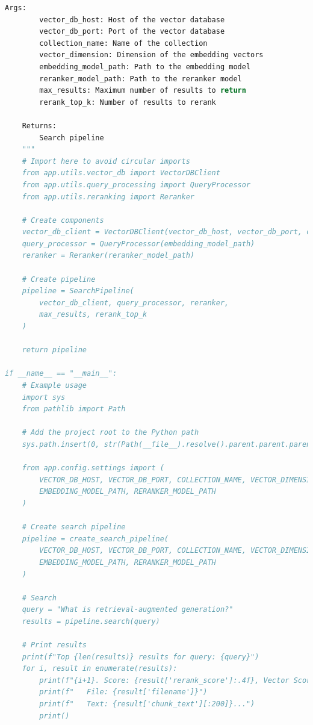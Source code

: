 \documentclass[
  screen,review,acmlarge]{acmart}
\begin{document}
\begin{lstlisting}[language=Python]
    Args:
        vector_db_host: Host of the vector database
        vector_db_port: Port of the vector database
        collection_name: Name of the collection
        vector_dimension: Dimension of the embedding vectors
        embedding_model_path: Path to the embedding model
        reranker_model_path: Path to the reranker model
        max_results: Maximum number of results to return
        rerank_top_k: Number of results to rerank
        
    Returns:
        Search pipeline
    """
    # Import here to avoid circular imports
    from app.utils.vector_db import VectorDBClient
    from app.utils.query_processing import QueryProcessor
    from app.utils.reranking import Reranker
    
    # Create components
    vector_db_client = VectorDBClient(vector_db_host, vector_db_port, collection_name, vector_dimension)
    query_processor = QueryProcessor(embedding_model_path)
    reranker = Reranker(reranker_model_path)
    
    # Create pipeline
    pipeline = SearchPipeline(
        vector_db_client, query_processor, reranker,
        max_results, rerank_top_k
    )
    
    return pipeline

if __name__ == "__main__":
    # Example usage
    import sys
    from pathlib import Path
    
    # Add the project root to the Python path
    sys.path.insert(0, str(Path(__file__).resolve().parent.parent.parent))
    
    from app.config.settings import (
        VECTOR_DB_HOST, VECTOR_DB_PORT, COLLECTION_NAME, VECTOR_DIMENSION,
        EMBEDDING_MODEL_PATH, RERANKER_MODEL_PATH
    )
    
    # Create search pipeline
    pipeline = create_search_pipeline(
        VECTOR_DB_HOST, VECTOR_DB_PORT, COLLECTION_NAME, VECTOR_DIMENSION,
        EMBEDDING_MODEL_PATH, RERANKER_MODEL_PATH
    )
    
    # Search
    query = "What is retrieval-augmented generation?"
    results = pipeline.search(query)
    
    # Print results
    print(f"Top {len(results)} results for query: {query}")
    for i, result in enumerate(results):
        print(f"{i+1}. Score: {result['rerank_score']:.4f}, Vector Score: {result['score']:.4f}")
        print(f"   File: {result['filename']}")
        print(f"   Text: {result['chunk_text'][:200]}...")
        print()
\end{lstlisting}
\end{document}
